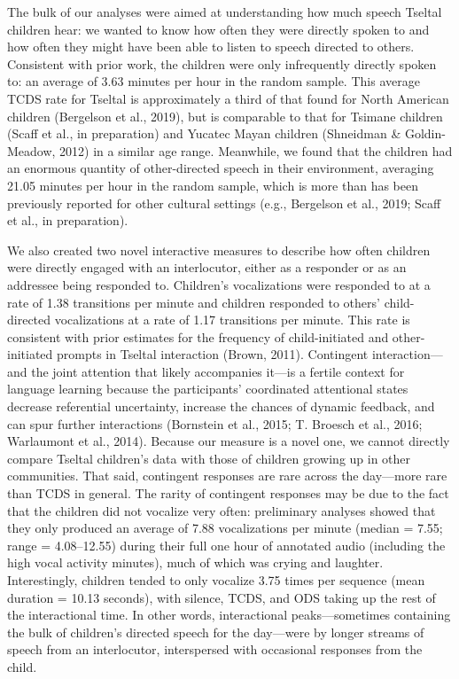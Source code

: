 \documentclass[floatsintext,man]{apa6}
\theoremstyle{definition}
\theoremstyle{definition}
\theoremstyle{definition}
\theoremstyle{remark}
\begin{document}
The bulk of our analyses were aimed at understanding how much speech
Tseltal children hear: we wanted to know how often they were directly
spoken to and how often they might have been able to listen to speech
directed to others. Consistent with prior work, the children were only
infrequently directly spoken to: an average of 3.63 minutes per hour in
the random sample. This average TCDS rate for Tseltal is approximately a
third of that found for North American children (Bergelson et al.,
2019), but is comparable to that for Tsimane children (Scaff et al., in
preparation) and Yucatec Mayan children (Shneidman \& Goldin-Meadow,
2012) in a similar age range. Meanwhile, we found that the children had
an enormous quantity of other-directed speech in their environment,
averaging 21.05 minutes per hour in the random sample, which is more
than has been previously reported for other cultural settings (e.g.,
Bergelson et al., 2019; Scaff et al., in preparation).

We also created two novel interactive measures to describe how often
children were directly engaged with an interlocutor, either as a
responder or as an addressee being responded to. Children's
vocalizations were responded to at a rate of 1.38 transitions per minute
and children responded to others' child-directed vocalizations at a rate
of 1.17 transitions per minute. This rate is consistent with prior
estimates for the frequency of child-initiated and other-initiated
prompts in Tseltal interaction (Brown, 2011). Contingent
interaction---and the joint attention that likely accompanies it---is a
fertile context for language learning because the participants'
coordinated attentional states decrease referential uncertainty,
increase the chances of dynamic feedback, and can spur further
interactions (Bornstein et al., 2015; T. Broesch et al., 2016;
Warlaumont et al., 2014). Because our measure is a novel one, we cannot
directly compare Tseltal children's data with those of children growing
up in other communities. That said, contingent responses are rare across
the day---more rare than TCDS in general. The rarity of contingent
responses may be due to the fact that the children did not vocalize very
often: preliminary analyses showed that they only produced an average of
7.88 vocalizations per minute (median = 7.55; range = 4.08--12.55)
during their full one hour of annotated audio (including the high vocal
activity minutes), much of which was crying and laughter. Interestingly,
children tended to only vocalize 3.75 times per sequence (mean duration
= 10.13 seconds), with silence, TCDS, and ODS taking up the rest of the
interactional time. In other words, interactional peaks---sometimes
containing the bulk of children's directed speech for the day---were by
longer streams of speech from an interlocutor, interspersed with
occasional responses from the child.
\end{document}
